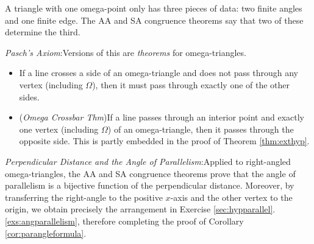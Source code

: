 A triangle with one omega-point only has three pieces of data: two finite angles and one finite edge. The AA and SA congruence theorems say that two of these determine the third.


\emph{Pasch's Axiom}:\quad Versions of this are \emph{theorems} for omega-triangles.
\begin{itemize}
  \item If a line crosses a side of an omega-triangle and does not pass through any vertex (including $\Omega$), then it must pass through exactly one of the other sides.
  \item (\emph{Omega Crossbar Thm})\lstsp If a line passes through an interior point and exactly one vertex (including $\Omega$) of an omega-triangle, then it passes through the opposite side. This is partly embedded in the proof of Theorem \ref{thm:exthyp}.
\end{itemize}


\emph{Perpendicular Distance and the Angle of Parallelism}:\quad Applied to right-angled omega-triangles, the AA and SA congruence theorems prove that the angle of parallelism is a bijective function of the perpendicular distance. Moreover, by transferring the right-angle to the positive $x$-axis and the other vertex to the origin, we obtain precisely the arrangement in Exercise \ref*{sec:hypparallel}.\ref{exs:angparallelism}, therefore completing the proof of Corollary \ref{cor:parangleformula}.




% 

